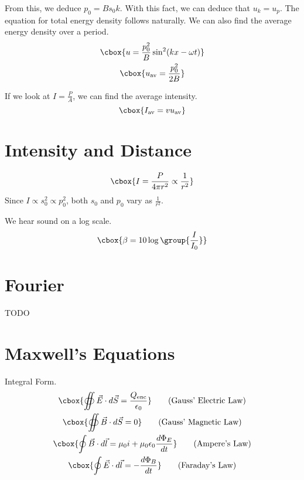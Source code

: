 \documentclass{hw}
\numberwithin{equation}{section}
\begin{document}
From this, we deduce $p_0 = B s_0 k$. With this fact, we can deduce that $u_k =
u_p$. The equation for total energy density follows naturally. We can also find
the average energy density over a period.
\begin{gather}
  \cbox{u             = \frac{p_0^2}{B} \sin^2(kx - \omega t)} \\
  \cbox{u_{\text{av}} = \frac{p_0^2}{2B}}                     
\end{gather}

If we look at $I = \frac{P}{A}$, we can find the average intensity.
\begin{equation}
  \cbox{I_{\text{av}} = vu_{\text{av}}}
\end{equation}

\section{Intensity and Distance}
\begin{equation}
\cbox{%
  I = \frac{P}{4 \pi r^2} \propto \frac{1}{r^2}
}
\end{equation}
Since $I \propto s_0^2 \propto p_0^2$, both $s_0$ and $p_0$ vary as
$\frac{1}{r^2}$.

We hear sound on a log scale.
\begin{equation}
\cbox{%
  \beta = 10 \log\group{\frac{I}{I_0}}
}
\end{equation}

\section{Fourier}
TODO

\section{Maxwell's Equations}
Integral Form.
\begin{gather}
  \cbox{\oiint \vec{E} \cdot d\vec{S} = \frac{Q_\text{enc}}{\epsilon_0}}             
    \tag{Gauss' Electric Law} \\
  \cbox{\oiint \vec{B} \cdot d\vec{S} = 0}                                           
    \tag{Gauss' Magnetic Law} \\
  \cbox{\oint  \vec{B} \cdot d\vec{l} = \mu_0i + \mu_0\epsilon_0\frac{d \Phi_E}{dt}} 
    \tag{Ampere's Law}        \\
  \cbox{\oint  \vec{E} \cdot d\vec{l} = - \frac{d\Phi_B}{dt}}
    \tag{Faraday's Law}
\end{gather}
\end{document}
